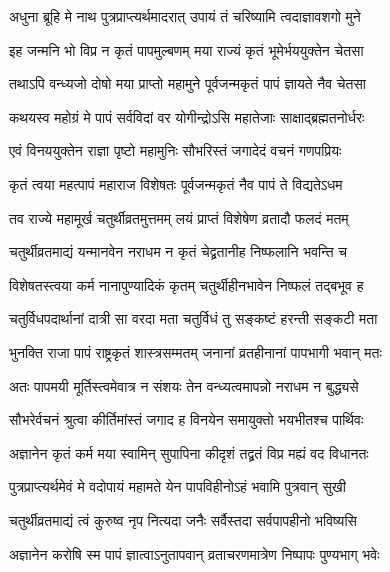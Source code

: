 \twolineshloka
{अधुना ब्रूहि मे नाथ पुत्रप्राप्त्यर्थमादरात्}
{उपायं तं चरिष्यामि त्वदाज्ञावशगो मुने} %

\twolineshloka
{इह जन्मनि भो विप्र न कृतं पापमुल्बणम्}
{मया राज्यं कृतं भूमेर्भययुक्तेन चेतसा} %

\twolineshloka
{तथाऽपि वन्ध्यजो दोषो मया प्राप्तो महामुने}
{पूर्वजन्मकृतं पापं ज्ञायते नैव चेतसा} %

\twolineshloka
{कथयस्व महोग्रं मे पापं सर्वविदां वर}
{योगीन्द्रोऽसि महातेजाः साक्षाद्ब्रह्मतनोर्धरः} %


\twolineshloka
{एवं विनययुक्तेन राज्ञा पृष्टो महामुनिः}
{सौभरिस्तं जगादेदं वचनं गणपप्रियः} %


\twolineshloka
{कृतं त्वया महत्पापं महाराज विशेषतः}
{पूर्वजन्मकृतं नैव पापं ते विद्यतेऽधम} %

\twolineshloka
{तव राज्ये महामूर्ख चतुर्थीव्रतमुत्तमम्}
{लयं प्राप्तं विशेषेण व्रतादौ फलदं मतम्} %

\twolineshloka
{चतुर्थीव्रतमाद्यं यन्मानवेन नराधम}
{न कृतं चेद्व्रतानीह निष्फलानि भवन्ति च} %

\twolineshloka
{विशेषतस्त्वया कर्म नानापुण्यादिकं कृतम्}
{चतुर्थीहीनभावेन निष्फलं तद्बभूव ह} %

\twolineshloka
{चतुर्विधपदार्थानां दात्री सा वरदा मता}
{चतुर्विधं तु सङ्कष्टं हरन्ती सङ्कटी मता} %

\twolineshloka
{भुनक्ति राजा पापं राष्ट्रकृतं शास्त्रसम्मतम्}
{जनानां व्रतहीनानां पापभागी भवान् मतः} %

\twolineshloka
{अतः पापमयी मूर्तिस्त्वमेवात्र न संशयः}
{तेन वन्ध्यत्वमापन्नो नराधम न बुद्ध्यसे} %

\twolineshloka
{सौभरेर्वचनं श्रुत्वा कीर्तिमांस्तं जगाद ह}
{विनयेन समायुक्तो भयभीतश्च पार्थिवः} %


\twolineshloka
{अज्ञानेन कृतं कर्म मया स्वामिन् सुपापिना}
{कीदृशं तद्व्रतं विप्र मह्यं वद विधानतः} %

\twolineshloka
{पुत्रप्राप्त्यर्थमेवं मे वदोपायं महामते}
{येन पापविहीनोऽहं भवामि पुत्रवान् सुखी} %


\twolineshloka
{चतुर्थीव्रतमाद्यं त्वं कुरुष्व नृप नित्यदा}
{जनैः सर्वैस्तदा सर्वपापहीनो भविष्यसि} %

\twolineshloka
{अज्ञानेन करोषि स्म पापं ज्ञात्वाऽनुतापवान्}
{व्रताचरणमात्रेण निष्पापः पुण्यभाग् भवेः} %

